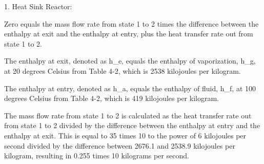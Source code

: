 1. Heat Sink Reactor:

Zero equals the mass flow rate from state 1 to 2 times the difference between the enthalpy at exit and the enthalpy at entry, plus the heat transfer rate out from state 1 to 2.

The enthalpy at exit, denoted as h_e, equals the enthalpy of vaporization, h_g, at 20 degrees Celsius from Table 4-2, which is 2538 kilojoules per kilogram.

The enthalpy at entry, denoted as h_a, equals the enthalpy of fluid, h_f, at 100 degrees Celsius from Table 4-2, which is 419 kilojoules per kilogram.

The mass flow rate from state 1 to 2 is calculated as the heat transfer rate out from state 1 to 2 divided by the difference between the enthalpy at entry and the enthalpy at exit. This is equal to 35 times 10 to the power of 6 kilojoules per second divided by the difference between 2676.1 and 2538.9 kilojoules per kilogram, resulting in 0.255 times 10 kilograms per second.